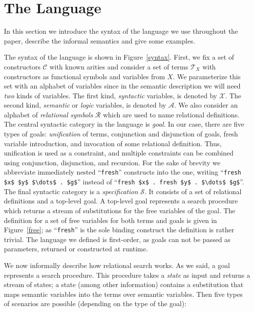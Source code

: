 \section{The Language}
\label{language}
 
In this section we introduce the syntax of the language we use throughout the paper, describe the informal semantics and give some examples.

The syntax of the language is shown in Figure~\ref{syntax}. First, we fix a set of constructors $\mathcal{C}$ with known arities and consider
a set of terms $\mathcal{T}_X$ with constructors as functional symbols and variables from $X$. We parameterize this set with an alphabet of
variables since in the semantic description we will need \emph{two} kinds of variables. The first kind, \emph{syntactic} variables, is denoted
by $\mathcal{X}$. The second kind, \emph{semantic} or \emph{logic} variables, is denoted by $\mathcal{A}$.
We also consider an alphabet of \emph{relational symbols} $\mathcal{R}$ which are used to name relational definitions.
The central syntactic category in the language is \emph{goal}. In our case, there are five types of goals: \emph{unification} of terms,
conjunction and disjunction of goals, fresh variable introduction, and invocation of some relational definition. Thus, unification is used
as a constraint, and multiple constraints can be combined using conjunction, disjunction, and recursion. For the sake of brevity we
abbreviate immediately nested ``\lstinline|fresh|'' constructs into the one, writing ``\lstinline|fresh $x$ $y$ $\dots$ . $g$|'' instead of
``\lstinline|fresh $x$ . fresh $y$ . $\dots$ $g$|''. The final syntactic category is a \emph{specification} $\mathcal{S}$. It consists of a set
of relational definitions and a top-level goal. A top-level goal represents a search procedure which returns a stream of substitutions for
the free variables of the goal. The definition for a set of free variables for both terms and goals is given in Figure~\ref{free}; as ``\lstinline|fresh|''
is the sole binding construct the definition is rather trivial. The language we defined is first-order, as goals can not be passed as parameters,
returned or constructed at runtime.

We now informally describe how relational search works. As we said, a goal represents a search procedure. This procedure takes a \emph{state} as input and returns a
stream of states; a state (among other information) contains a substitution that maps semantic variables into the terms over semantic variables. Then five types of
scenarios are possible (depending on the type of the goal):

